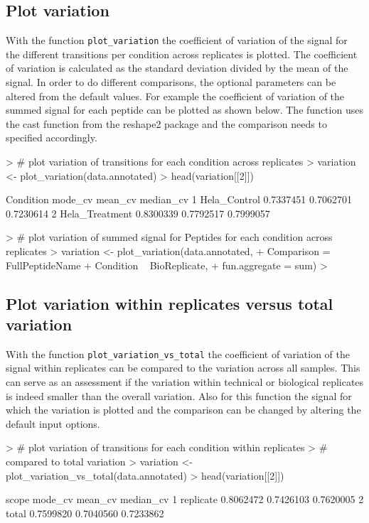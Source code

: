 \documentclass[a4paper]{article}
\begin{document}
\subsection{Plot variation}
With the function \texttt{plot\_variation} the coefficient of variation of the signal for the different transitions per condition across replicates is plotted. The coefficient of variation is calculated as the standard deviation divided by the mean of the signal. In order to do different comparisons, the optional parameters can be altered from the default values. For example the coefficient of variation of the summed signal for each peptide can be plotted as shown below. The function uses the cast function from the reshape2 package and the comparison needs to specified accordingly.

\begin{Schunk}
\begin{Sinput}
> # plot variation of transitions for each condition across replicates
> variation <- plot_variation(data.annotated)
> head(variation[[2]])
\end{Sinput}
\begin{Soutput}
       Condition   mode_cv   mean_cv median_cv
1   Hela_Control 0.7337451 0.7062701 0.7230614
2 Hela_Treatment 0.8300339 0.7792517 0.7999057
\end{Soutput}
\begin{Sinput}
> # plot variation of summed signal for Peptides for each condition across replicates
> variation <- plot_variation(data.annotated,
+                Comparison = FullPeptideName + Condition ~ BioReplicate,
+                fun.aggregate = sum)
> 
\end{Sinput}
\end{Schunk}

\subsection{Plot variation within replicates versus total variation}
With the function \texttt{plot\_variation\_vs\_total} the coefficient of variation of the signal within replicates can be compared to the variation across all samples. This can serve as an assessment if the variation within technical or biological replicates is indeed smaller than the overall variation. Also for this function the signal for which the variation is plotted and the comparison can be changed by altering the default input options.

\begin{Schunk}
\begin{Sinput}
> # plot variation of transitions for each condition within replicates
> # compared to total variation
> variation <- plot_variation_vs_total(data.annotated)
> head(variation[[2]])
\end{Sinput}
\begin{Soutput}
      scope   mode_cv   mean_cv median_cv
1 replicate 0.8062472 0.7426103 0.7620005
2     total 0.7599820 0.7040560 0.7233862
\end{Soutput}
\end{Schunk}
\end{document}
